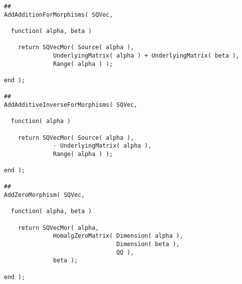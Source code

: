 \begin{small}
\begin{Verbatim}[frame=single]
##
AddAdditionForMorphisms( SQVec,
                         
  function( alpha, beta )
    
    return SQVecMor( Source( alpha ),
              UnderlyingMatrix( alpha ) + UnderlyingMatrix( beta ),
              Range( alpha ) );
    
end );

##
AddAdditiveInverseForMorphisms( SQVec,
                                
  function( alpha )
    
    return SQVecMor( Source( alpha ),
              - UnderlyingMatrix( alpha ),
              Range( alpha ) );
    
end );

##
AddZeroMorphism( SQVec,
                     
  function( alpha, beta )
    
    return SQVecMor( alpha,
              HomalgZeroMatrix( Dimension( alpha ),
                                Dimension( beta ),
                                QQ ),
              beta );
    
end );
\end{Verbatim}
\end{small}